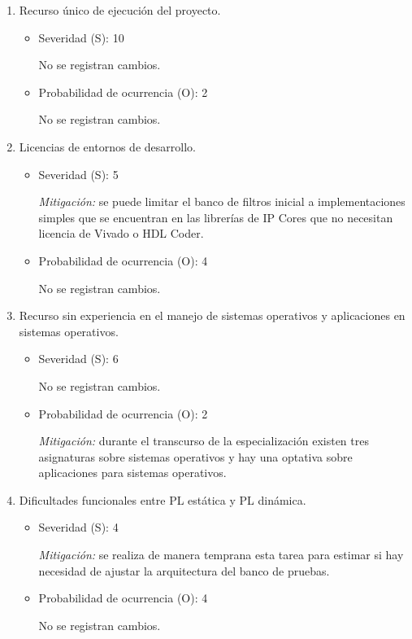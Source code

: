\documentclass[
11pt, %
]{charter}
\begin{document}
\begin{enumerate}[]
\begin{enumerate}[$\text{Riesgo}$ 1:, leftmargin=*,align=left]
		\item Recurso único de ejecución del proyecto.
		\begin{itemize}
			\item Severidad (S): 10
			
			No se registran cambios.
			\item Probabilidad de ocurrencia (O): 2
			
			No se registran cambios.
		\end{itemize}

		\item Licencias de entornos de desarrollo.
		\begin{itemize}
			\item Severidad (S): 5
			
			\emph{Mitigación:} se puede limitar el banco de filtros inicial a implementaciones simples que se encuentran en las librerías de IP Cores que no necesitan licencia de Vivado o HDL Coder.
			\item Probabilidad de ocurrencia (O): 4
			
			No se registran cambios.
		\end{itemize}
	
		\item Recurso sin experiencia en el manejo de sistemas operativos y aplicaciones en sistemas operativos.
		\begin{itemize}
			\item Severidad (S): 6
			
			No se registran cambios.
			\item Probabilidad de ocurrencia (O): 2
			
			\emph{Mitigación:} durante el transcurso de la especialización existen tres asignaturas sobre sistemas operativos y hay una optativa sobre aplicaciones para sistemas operativos.
		\end{itemize}

		\item Dificultades funcionales entre PL estática y PL dinámica.
		\begin{itemize}
			\item Severidad (S): 4
			
			\emph{Mitigación:} se realiza de manera temprana esta tarea para estimar si hay necesidad de ajustar la arquitectura del banco de pruebas.
			\item Probabilidad de ocurrencia (O): 4
			
			No se registran cambios.
		\end{itemize}


\end{enumerate}
\end{enumerate}
\end{document}
